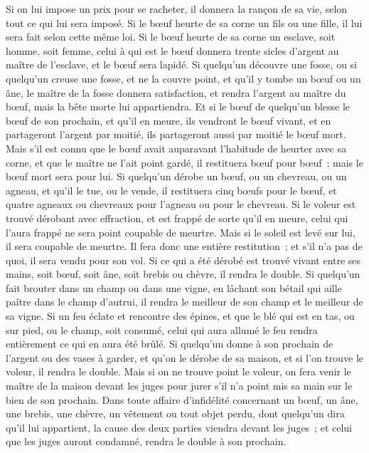 \begin{multicols}{2}
Si on lui impose un prix pour se racheter, il donnera la rançon de sa vie, selon tout ce qui lui sera imposé.
Si le bœuf heurte de sa corne un fils ou une fille, il lui sera fait selon cette même loi.
Si le bœuf heurte de sa corne un esclave, soit homme, soit femme, celui à qui est le bœuf donnera trente sicles d'argent au maître de l'esclave, et le bœuf sera lapidé.
Si quelqu'un découvre une fosse, ou si quelqu'un creuse une fosse, et ne la couvre point, et qu'il y tombe un bœuf ou un âne,
le maître de la fosse donnera satisfaction, et rendra l'argent au maître du bœuf, mais la bête morte lui appartiendra.
Et si le bœuf de quelqu'un blesse le bœuf de son prochain, et qu'il en meure, ils vendront le bœuf vivant, et en partageront l'argent par moitié, ils partageront aussi par moitié le bœuf mort.
Mais s'il est connu que le bœuf avait auparavant l'habitude de heurter avec sa corne, et que le maître ne l'ait point gardé, il restituera bœuf pour bœuf~; mais le bœuf mort sera pour lui.
\VerseOne{}Si quelqu'un dérobe un bœuf, ou un chevreau, ou un agneau, et qu'il le tue, ou le vende, il restituera cinq bœufs pour le bœuf, et quatre agneaux ou chevreaux pour l'agneau ou pour le chevreau.
Si le voleur est trouvé dérobant avec effraction, et est frappé de sorte qu'il en meure, celui qui l'aura frappé ne sera point coupable de meurtre.
Mais si le soleil est levé sur lui, il sera coupable de meurtre. Il fera donc une entière restitution~; et s'il n'a pas de quoi, il sera vendu pour son vol.
Si ce qui a été dérobé est trouvé vivant entre ses mains, soit bœuf, soit âne, soit brebis ou chèvre, il rendra le double.
Si quelqu'un fait brouter dans un champ ou dans une vigne, en lâchant son bétail qui aille paître dans le champ d'autrui, il rendra le meilleur de son champ et le meilleur de sa vigne.
Si un feu éclate et rencontre des épines, et que le blé qui est en tas, ou sur pied, ou le champ, soit consumé, celui qui aura allumé le feu rendra entièrement ce qui en aura été brûlé.
Si quelqu'un donne à son prochain de l'argent ou des vases à garder, et qu'on le dérobe de sa maison, et si l'on trouve le voleur, il rendra le double.
Mais si on ne trouve point le voleur, on fera venir le maître de la maison devant les juges pour jurer s'il n'a point mis sa main sur le bien de son prochain.
Dans toute affaire d'infidélité concernant un bœuf, un âne, une brebis, une chèvre, un vêtement ou tout objet perdu, dont quelqu'un dira qu'il lui appartient, la cause des deux parties viendra devant les juges~; et celui que les juges auront condamné, rendra le double à son prochain.

\end{multicols}
